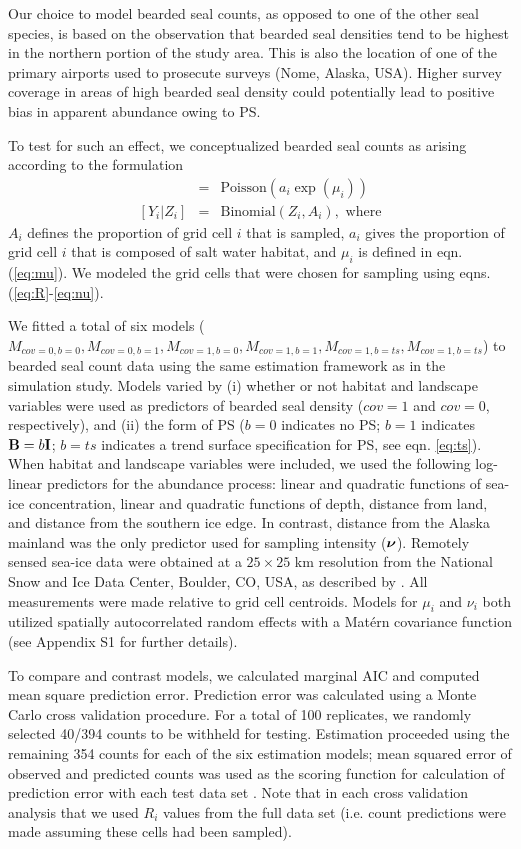 \documentclass[times,mee,doublespace,]{besauth2}
\begin{document}
Our choice to model bearded seal counts, as opposed to one of the other seal species, is based on the observation that bearded seal densities tend to be highest in the northern portion of the study area. This is also the location of one of the primary airports used to prosecute surveys (Nome, Alaska, USA).  Higher survey coverage in areas of high bearded seal density could potentially lead to positive bias in apparent abundance owing to PS.

To test for such an effect, we conceptualized bearded seal counts as arising according to the formulation
\begin{eqnarray*}
  [Z_i | \mu_i] & = & \textrm{Poisson}(a_i \exp(\mu_i)) \\
{}  [Y_i|Z_i] & = & \textrm{Binomial}(Z_i, A_i), \text{ where}
\end{eqnarray*}
$A_i$ defines the proportion of grid cell $i$ that is sampled, $a_i$ gives the proportion of grid cell $i$ that is composed of salt water habitat, and $\mu_i$ is defined in eqn. (\ref{eq:mu}).
We modeled the grid cells that were chosen for sampling using eqns. (\ref{eq:R}-\ref{eq:nu}).

We fitted a total of six models ($M_{cov=0,b=0},M_{cov=0,b=1},M_{cov=1,b=0},M_{cov=1,b=1},M_{cov=1,b=ts},M_{cov=1,b=ts}$) to bearded seal count data using the same estimation framework as in the simulation study.  Models varied by (i) whether or not habitat and landscape variables were used as predictors of bearded seal density ($cov=1$ and $cov=0$, respectively), and (ii) the form of PS ($b=0$ indicates no PS; $b=1$ indicates ${\bf B}=b{\bf I}$; $b=ts$ indicates a trend surface specification for PS, see eqn. \ref{eq:ts}).  When habitat and landscape variables were included, we used the following log-linear predictors for the abundance process: linear and quadratic functions of sea-ice concentration, linear and quadratic functions of depth, distance from land, and distance from the southern ice edge. In contrast, distance from the Alaska mainland was the only predictor used for sampling intensity ($\boldsymbol{\nu}$). Remotely sensed sea-ice data were obtained at a $25 \times 25$ km resolution from the National Snow and Ice Data Center, Boulder, CO, USA, as described by \citet{ConnEtAl2014}. All measurements were made relative to grid cell centroids.  Models for $\mu_i$ and $\nu_i$ both utilized spatially autocorrelated random effects with a Mat\'{e}rn covariance function (see Appendix S1 for further details).

To compare and contrast models, we calculated marginal AIC and computed mean square prediction error. Prediction error was calculated using a Monte Carlo cross validation procedure.  For a total of 100 replicates, we randomly selected 40/394 counts to be withheld for testing.  Estimation proceeded using the remaining 354 counts for each of the six estimation models; mean squared error of observed and predicted counts was used as the scoring function for calculation of prediction error with each test data set \citep{HootenHobbs2015}.  Note that in each cross validation analysis that we used $R_i$ values from the full data set (i.e. count predictions were made assuming these cells had been sampled).
\end{document}
